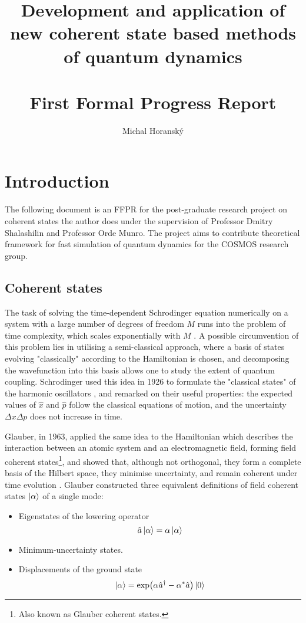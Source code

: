 \documentclass[12pt]{article}
\begin{document}
	\title{Development and application of new coherent state based methods of quantum dynamics\\\hfill\\First Formal Progress Report}
	\author{Michal Horanský}
	\maketitle
	
	\tableofcontents
	
	\section{Introduction}
	The following document is an FFPR for the post-graduate research project on coherent states the author does under the supervision of Professor Dmitry Shalashilin and Professor Orde Munro. The project aims to contribute theoretical framework for fast simulation of quantum dynamics for the COSMOS research group.
	\subsection{Coherent states}
	The task of solving the time-dependent Schrodinger equation numerically on a system with a large number of degrees of freedom $M$ runs into the problem of time complexity, which scales exponentially with $M$ \cite[Sec. 1.2]{curse_of_dimensionality}. A possible circumvention of this problem lies in utilising a semi-classical approach, where a basis of states evolving "classically" according to the Hamiltonian is chosen, and decomposing the wavefunction into this basis allows one to study the extent of quantum coupling. Schrodinger used this idea in 1926 to formulate the "classical states" of the harmonic oscillators \cite{harmonic_classical_states}, and remarked on their useful properties: the expected values of $\hat{x}$ and $\hat{p}$ follow 	the classical equations of motion, and the uncertainty $\Delta x\Delta p$ does not increase in time.
	
	Glauber, in 1963, applied the same idea to the Hamiltonian which describes the interaction between an atomic system and an electromagnetic field, forming field coherent states\footnote{Also known as Glauber coherent states.}, and showed that, although not orthogonal, they form a complete basis of the Hilbert space, they minimise uncertainty, and remain coherent under time evolution \cite{field_coherent_states}. Glauber constructed three equivalent definitions of field coherent states $\ket{\alpha}$ of a single mode:
	\begin{itemize}
		\item Eigenstates of the lowering operator
		$$\hat{a}\ket{\alpha} = \alpha\ket{\alpha}$$
		\item Minimum-uncertainty states.
		\item Displacements of the ground state
		$$\ket{\alpha} = \exp(\alpha\hat{a}^\dagger-\alpha^*\hat{a})\ket{0}$$
	\end{itemize}
	
\end{document}
